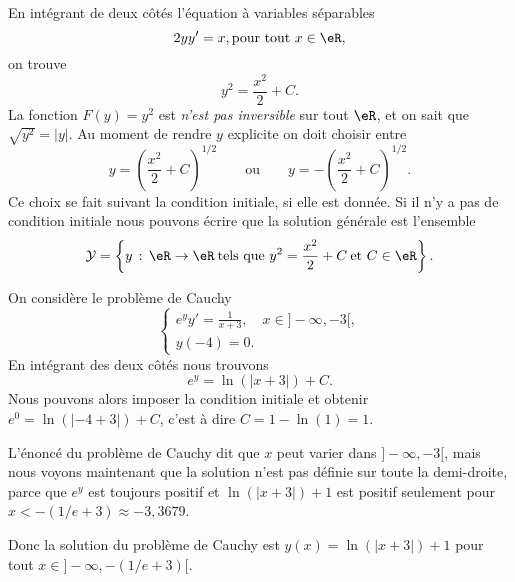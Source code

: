 \begin{example}
	En intégrant de deux côtés l'équation à variables séparables
	\begin{equation}
		2y y' = x, \text{pour tout } x\in\eR,
	\end{equation}
	on trouve
	\[
		y^2 = \frac{x^2}{2} + C .
	\]
	La fonction $F(y) = y^2$ est \emph{n'est pas inversible} sur tout $\eR$, et on sait que \(\sqrt{y^2} = |y|\).  Au moment de rendre $y$ explicite on doit choisir entre
	\[
		y = \left(\frac{x^2}{2} + C \right)^{1/2}\qquad \text{ou}\qquad y = -\left(\frac{x^2}{2} + C \right)^{1/2} .
	\]
	Ce choix se fait suivant la condition initiale, si elle est donnée. Si il n'y a pas de condition initiale nous pouvons écrire que la solution générale est l'ensemble
	\[
		\mathcal{Y} =\left\{ y \,:\, \eR \to \eR\:\text{tels que }  y^2 = \frac{x^2}{2} + C \:\text{et } C\in\eR\right\}.
	\]
\end{example}

\begin{example}
	On considère le problème de Cauchy
	\begin{equation}
		\begin{cases}
			e^y y' = \frac{1}{x+3}, \quad x\in ]-\infty, -3[, \\
			y(-4) = 0.
		\end{cases}
	\end{equation}
	En intégrant des deux côtés nous trouvons
	\[
		e^y = \ln(|x+3|) +C.
	\]
	Nous pouvons alors imposer la condition initiale et obtenir $e^{0} =\ln(|-4+3|) +C $, c'est \`a dire $C = 1- \ln(1) = 1$.
	\begin{remark}
		L'énoncé du problème de Cauchy dit que $x$ peut varier dans \(]-\infty, -3[\), mais nous voyons maintenant que la solution n'est pas définie sur toute la demi-droite, parce que $e^y$ est toujours positif  et $\ln(|x+3|) +1$ est positif seulement pour $x < -(1/e + 3)\approx -3,3679$.
	\end{remark}
	Donc la solution du problème de Cauchy est \(y(x) = \ln(|x+3|) +1\) pour tout $x\in ]-\infty, -(1/e +3)[$.
\end{example}

